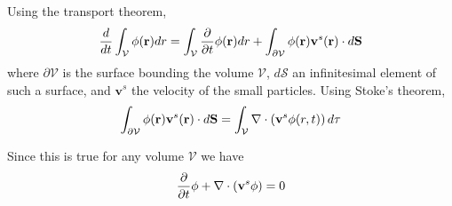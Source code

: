 Using the transport theorem,
\begin{equation}
	\frac{d {}}{d {t}} \int_\mathcal{V} \phi(\mathbf{r}) dr = \int_\mathcal{V} \frac{\partial {}}{\partial {t}} \phi(\mathbf{r}) dr + \int_{\partial\mathcal{V}} \phi(\mathbf{r}) \mathbf{v}^s(\mathbf{r}) \cdot d \mathbf{S}
\end{equation}
where $\partial \mathcal{V}$ is the surface bounding the volume $\mathcal{V}$, $d\mathcal{S}$ an infinitesimal element of such a surface, and $\mathbf{v}^s$ the velocity of the small particles.
Using Stoke's theorem,
\begin{equation}
	\int_{\partial\mathcal{V}} \phi(\mathbf{r}) \mathbf{v}^s(\mathbf{r}) \cdot d \mathbf{S} = \int_\mathcal{V} \nabla \cdot \left( \mathbf{v}^s \phi(r,t) \right) d\tau 
\end{equation}

Since this is true for any volume $\mathcal{V}$ we have
\begin{equation}
	\frac{\partial {}}{\partial {t}}\phi + \nabla \cdot ( \mathbf{v}^s \phi ) = 0
\end{equation}

